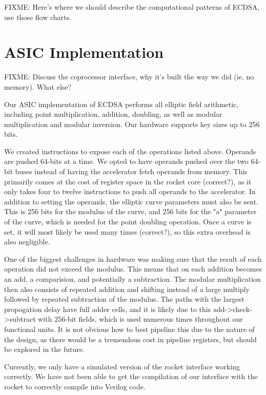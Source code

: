 \documentclass[twocolumn]{article}
\begin{document}
FIXME: Here's where we should describe the computational patterns of
ECDSA, use those flow charts.

\section{ASIC Implementation}

FIXME: Discuss the coprocessor interface, why it's built the way we
did (ie, no memory).  What else?

Our ASIC implementation of ECDSA performs all elliptic field arithmetic,
including point multiplication, addition, doubling, as well as modular
multiplication and modular inversion. Our hardware supports key sizes
up to 256 bits. 

We created instructions to expose each of the operations listed above. Operands
are pushed 64-bits at a time. We opted to have operands pushed over the two 64-bit
buses instead of having the accelerator fetch operands from memory. This primarily 
comes at the cost of register space in the rocket core (correct?), as it only takes 
four to twelve instructions to push all operands to the accelerator. In addition to 
setting the operands, the elliptic curve parameters must also be sent. This is 256 bits
for the modulus of the curve, and 256 bits for the "a" parameter of the curve, which
is needed for the point doubling operation. Once a curve is set, it will most likely
be used many times (correct?), so this extra overhead is also negligible. 

One of the biggest challenges in hardware was making sure that the result of each 
operation did not exceed the modulus. This means that on each addition becomes an 
add, a comparision, and potentially a subtraction. The modular multiplication then 
also consists of repeated addition and shifting instead of a large multiply followed
by repeated subtraction of the modulus. The paths with the largest propogation delay
have full adder cells, and it is likely due to this add->check->subtract with 
256-bit fields, which is used numerous times throughout our functional units. It 
is not obvious how to best pipeline this due to the nature of the design, as there would
be a tremendous cost in pipeline registsrs, but should be explored in the future. 

Currently, we only have a simulated version of the rocket interface working correctly. 
We have not been able to get the compilation of our interface with the rocket to correctly
compile into Verilog code. 
\end{document}
